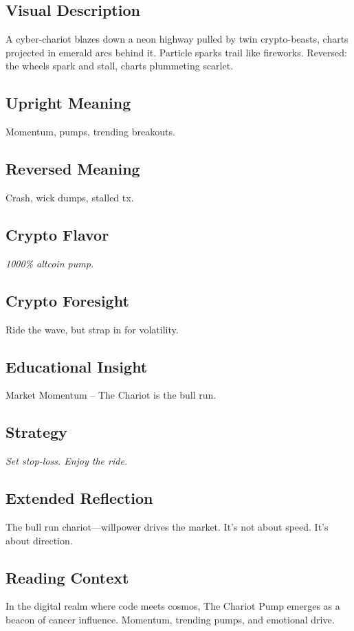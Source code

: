 \documentclass[11pt,oneside]{book}
\begin{document}
\begin{minipage}[t]{0.55\textwidth}
  \vspace{0pt}

  \subsection*{Visual Description}
  A cyber-chariot blazes down a neon highway pulled by twin crypto-beasts, charts projected in emerald arcs behind it. Particle sparks trail like fireworks. Reversed: the wheels spark and stall, charts plummeting scarlet.

  \subsection*{Upright Meaning}
  Momentum, pumps, trending breakouts.

  \subsection*{Reversed Meaning}
  Crash, wick dumps, stalled tx.

  \subsection*{Crypto Flavor}
  \textit{1000\% altcoin pump.}

  \subsection*{Crypto Foresight}
  Ride the wave, but strap in for volatility.

  \subsection*{Educational Insight}
  Market Momentum – The Chariot is the bull run.

  \subsection*{Strategy}
  \textit{Set stop-loss. Enjoy the ride.}

  \subsection*{Extended Reflection}
  The bull run chariot—willpower drives the market. It's not about speed. It's about direction.

  \subsection*{Reading Context}
  In the digital realm where code meets cosmos, The Chariot Pump emerges as a beacon of cancer influence. Momentum, trending pumps, and emotional drive.


\end{minipage}
\end{document}
